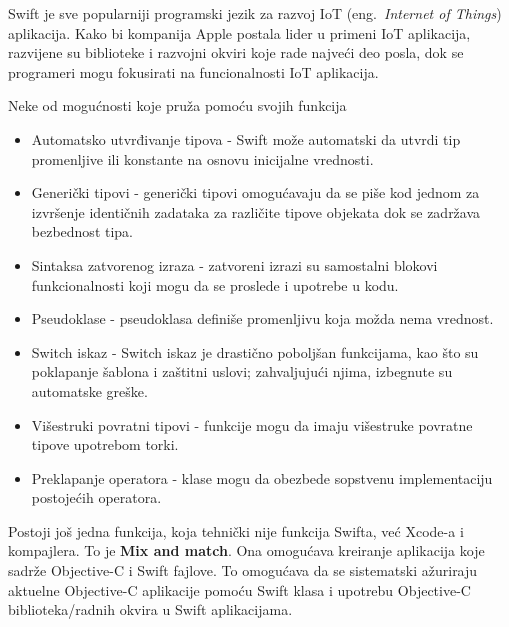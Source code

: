 \documentclass[a4paper]{article}
\begin{document}
Swift je sve popularniji programski jezik za razvoj IoT (eng.~{\em Internet of Things}) aplikacija. Kako bi kompanija Apple postala lider u primeni IoT aplikacija, razvijene su biblioteke i razvojni okviri koje rade najveći deo posla, dok se programeri mogu fokusirati na funcionalnosti IoT aplikacija.

Neke od mogućnosti koje pruža pomoću svojih funkcija \cite{mastering_swift3}
\begin{itemize}
\item Automatsko utvrđivanje tipova - Swift može automatski da utvrdi tip promenljive ili konstante na osnovu inicijalne
vrednosti. 
\item Generički tipovi - generički tipovi omogućavaju da se piše kod jednom za izvršenje identičnih
zadataka za različite tipove objekata dok se zadržava bezbednost tipa. 
\item Sintaksa zatvorenog izraza - zatvoreni izrazi su samostalni blokovi funkcionalnosti koji mogu da se proslede i upotrebe u kodu.
\item Pseudoklase - pseudoklasa definiše promenljivu koja možda nema vrednost.
\item Switch iskaz - Switch iskaz je drastično poboljšan funkcijama, kao što su poklapanje šablona i
zaštitni uslovi; zahvaljujući njima, izbegnute su automatske greške.
\item Višestruki povratni tipovi - funkcije mogu da imaju višestruke povratne tipove upotrebom torki. 
\item Preklapanje operatora - klase mogu da obezbede sopstvenu implementaciju postojećih operatora. 
\end{itemize}

Postoji još jedna funkcija, koja tehnički nije
funkcija Swifta, već Xcode-a i kompajlera. To je \textbf{Mix and match}. Ona omogućava kreiranje aplikacija koje sadrže Objective-C i Swift fajlove. To omogućava da se sistematski ažuriraju aktuelne Objective-C aplikacije pomoću Swift klasa i upotrebu Objective-C biblioteka/radnih okvira u Swift aplikacijama.
\end{document}
